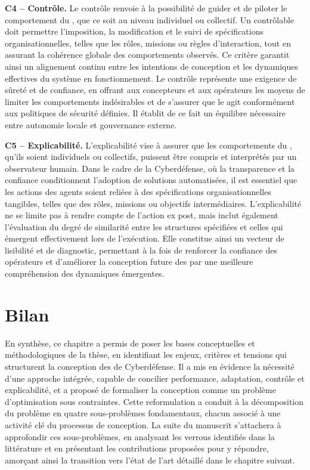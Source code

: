 \medskip

\noindent
\textbf{C4 -- Contrôle.} \quad
Le contrôle renvoie à la possibilité de guider et de piloter le comportement du , que ce soit au niveau individuel ou collectif. Un  contrôlable doit permettre l'imposition, la modification et le suivi de spécifications organisationnelles, telles que les rôles, missions ou règles d'interaction, tout en assurant la cohérence globale des comportements observés. Ce critère garantit ainsi un alignement continu entre les intentions de conception et les dynamiques effectives du système en fonctionnement. Le contrôle représente une exigence de sûreté et de confiance, en offrant aux concepteurs et aux opérateurs les moyens de limiter les comportements indésirables et de s'assurer que le  agit conformément aux politiques de sécurité définies. Il établit de ce fait un équilibre nécessaire entre autonomie locale et gouvernance externe.

\medskip

\noindent
\textbf{C5 -- Explicabilité.} \quad
L'explicabilité vise à assurer que les comportements du , qu'ils soient individuels ou collectifs, puissent être compris et interprétés par un observateur humain. Dans le cadre de la Cyberdéfense, où la transparence et la confiance conditionnent l'adoption de solutions automatisées, il est essentiel que les actions des agents soient reliées à des spécifications organisationnelles tangibles, telles que des rôles, missions ou objectifs intermédiaires. L'explicabilité ne se limite pas à rendre compte de l'action ex post, mais inclut également l'évaluation du degré de similarité entre les structures spécifiées et celles qui émergent effectivement lors de l'exécution. Elle constitue ainsi un vecteur de lisibilité et de diagnostic, permettant à la fois de renforcer la confiance des opérateurs et d'améliorer la conception future des  par une meilleure compréhension des dynamiques émergentes.

\section{Bilan}
En synthèse, ce chapitre a permis de poser les bases conceptuelles et méthodologiques de la thèse, en identifiant les enjeux, critères et tensions qui structurent la conception des  de Cyberdéfense. Il a mis en évidence la nécessité d'une approche intégrée, capable de concilier performance, adaptation, contrôle et explicabilité, et a proposé de formaliser la conception comme un problème d'optimisation sous contraintes. Cette reformulation a conduit à la décomposition du problème en quatre sous-problèmes fondamentaux, chacun associé à une activité clé du processus de conception. La suite du manuscrit s'attachera à approfondir ces sous-problèmes, en analysant les verrous identifiés dans la littérature et en présentant les contributions proposées pour y répondre, amorçant ainsi la transition vers l'état de l'art détaillé dans le chapitre suivant.

